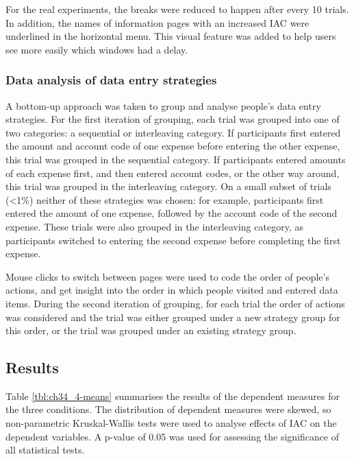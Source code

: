 For the real experiments, the breaks were reduced to happen after every 10 trials. In addition, the names of information pages with an increased IAC were underlined in the horizontal menu. This visual feature was added to help users see more easily which windows had a delay.

\subsubsection{Data analysis of data entry strategies}
A bottom-up approach was taken to group and analyse people's data entry strategies. For the first iteration of grouping, each trial was grouped into one of two categories: a sequential or interleaving category. If participants first entered the amount and account code of one expense before entering the other expense, this trial was grouped in the sequential category. If participants entered amounts of each expense first, and then entered account codes, or the other way around, this trial was grouped in the interleaving category. On a small subset of trials (<1\%) neither of these strategies was chosen: for example, participants first entered the amount of one expense, followed by the account code of the second expense. These trials were also grouped in the interleaving category, as participants switched to entering the second expense before completing the first expense.

Mouse clicks to switch between pages were used to code the order of people's actions, and get insight into the order in which people visited and entered data items. During the second iteration of grouping, for each trial the order of actions was considered and the trial was either grouped under a new strategy group for this order, or the trial was grouped under an existing strategy group. 


\subsection{Results}
Table \ref{tbl:ch34_4-means} summarises the results of the dependent measures for the three conditions. The distribution of dependent measures were skewed, so non-parametric Kruskal-Wallis tests were used to analyse effects of IAC on the dependent variables. A p-value of 0.05 was used for assessing the significance of all statistical tests. 


